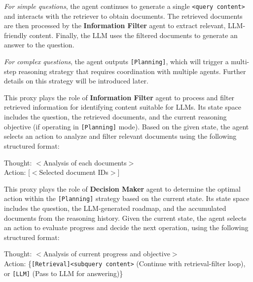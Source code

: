 \textit{For simple questions}, the agent continues to generate a single \texttt{<query content>} and interacts with the retriever to obtain documents. 
The retrieved documents are then processed by the \textbf{Information Filter} agent to extract relevant, LLM-friendly content. 
Finally, the LLM uses the filtered documents to generate an answer to the question.

\textit{For complex questions}, the agent outputs \texttt{[Planning]}, which will trigger a multi-step reasoning strategy that requires coordination with multiple agents. 
Further details on this strategy will be introduced later.


This proxy plays the role of \textbf{Information Filter} agent to process and filter retrieved information for identifying content suitable for LLMs. 
Its state space includes the question, the retrieved documents, and the current reasoning objective (if operating in \texttt{[Planning]} mode). 
Based on the given state, the agent selects an action to analyze and filter relevant documents using the following structured format:
\begin{tcolorbox}[boxsep=0mm,left=2.5mm,right=2.5mm]
Thought: $<$Analysis of each documents$>$\\
Action: [$<$Selected document IDs$>$]
\end{tcolorbox}

This proxy plays the role of \textbf{Decision Maker} agent to determine the optimal action within the \texttt{[Planning]} strategy based on the current state. 
Its state space includes the question, the LLM-generated roadmap, and the accumulated documents from the reasoning history. 
Given the current state, the agent selects an action to evaluate progress and decide the next operation, using the following structured format:
\begin{tcolorbox}[boxsep=0mm,left=2.5mm,right=2.5mm]
Thought: $<$Analysis of current progress and objective$>$\\
Action: \{\texttt{[Retrieval]<subquery content>} (Continue with retrieval-filter loop), or \texttt{[LLM]} (Pass to LLM for answering)\}%
\end{tcolorbox}

